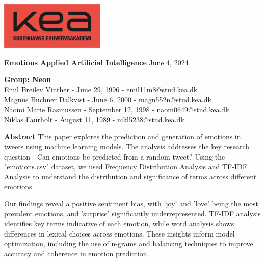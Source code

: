 \def\title{Emotions}

\def\subtitle{Applied Artificial Intelligence}

\def\date{June 4, 2024}

\def\author{
    \textbf{Group: Neon}
    \\
    Emil Breilev Vinther - June 29, 1996 - emil11m8@stud.kea.dk
    \\
    Magnus Büchner Dalkvist - June 6, 2000 - magn552n@stud.kea.dk
    \\
    Naomi Marie Rasmussen - September 12, 1998 - naom0649@stud.kea.dk
    \\
    Niklas Faurholt - August 11, 1989 - nikl5238@stud.kea.dk
}

\def\abstract{
\LARGE\textbf{Abstract}\vskip2mm
\large
This paper explores the prediction and generation of emotions in tweets using machine learning models. The analysis addresses the key research question - Can emotions be predicted from a random tweet? Using the "emotions.csv" dataset\autocite{emotions-dataset}, we used Frequency Distribution Analysis and TF-IDF Analysis to understand the distribution and significance of terms across different emotions.

Our findings reveal a positive sentiment bias, with 'joy' and 'love' being the most prevalent emotions, and 'surprise' significantly underrepresented. TF-IDF analysis identifies key terms indicative of each emotion, while word analysis shows differences in lexical choices across emotions. These insights inform model optimization, including the use of n-grams and balancing techniques to improve accuracy and coherence in emotion prediction.
}

\thispagestyle{empty}
\begin{flushright}
\includegraphics[width=5cm]{images/kea_logo.jpg}
\end{flushright}	
\vskip30mm
\begin{flushleft}
\large
\huge\textbf{\title}
\vskip2mm
\LARGE\textbf{\subtitle}
\vskip2mm
\large{\date}
\vskip3mm
\author
\end{flushleft}	
\vskip15mm
\abstract
\vfill
\restoregeometry